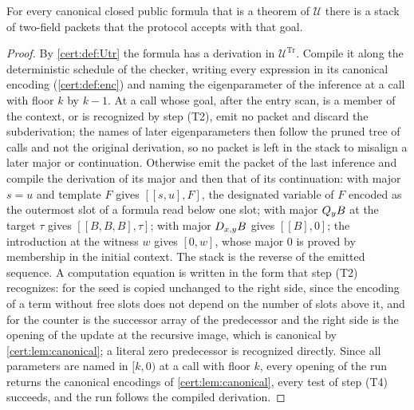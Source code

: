 \begin{theorem}\label{cert:thm:two-field-complete}
For every canonical closed public formula that is a theorem of $\mathcal U$
there is a stack of two-field packets that the protocol accepts with that
goal.
\end{theorem}
\begin{proof}
By \cref{cert:def:Utr} the formula has a derivation in $\mathcal U^{\mathrm{Tr}}$.
Compile it along the deterministic schedule of the checker, writing every
expression in its canonical encoding (\cref{cert:def:enc}) and naming the
eigenparameter of the inference at a call with floor $k$ by $k-1$. At a call
whose goal, after the entry scan, is a member of the context, or is
recognized by step (T2), emit no packet and discard the subderivation; the
names of later eigenparameters then follow the pruned tree of calls and not
the original derivation, so no packet is left in the stack to misalign a
later major or continuation. Otherwise emit the packet of the last inference
and compile the derivation of its major and then that of its continuation:
 with major $s=u$ and template $F$ gives $[[s,u],F]$, the
designated variable of $F$ encoded as the outermost slot of a formula read
below one slot;  with major $Q_{y}B$ at the target $\tau$ gives
$[[B,B,B],\tau]$;  with major $D_{x,y}B$ gives $[[B],0]$; the
introduction at the witness $w$ gives $[0,w]$, whose major $0$ is proved by
membership in the initial context. The stack is the reverse of the emitted
sequence. A computation equation is written in the form that step (T2)
recognizes: for  the seed is copied unchanged to the right side,
since the encoding of a term without free slots does not depend on the number
of slots above it, and for  the counter is the successor array
of the predecessor and the right side is the opening of the update at the
recursive image, which is canonical by \cref{cert:lem:canonical}; a literal
zero predecessor is recognized directly. Since all parameters are named in
$[k,0)$ at a call with floor $k$, every opening of the run returns the
canonical encodings of \cref{cert:lem:canonical}, every test of step (T4)
succeeds, and the run follows the compiled derivation.
\end{proof}

